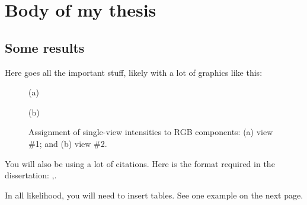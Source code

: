 \chapter{Body of my thesis}
\label{chapter:body}
\thispagestyle{myheadings}

\graphicspath{{2_Body/Figures/}}

\section{Some results}
\label{sec:results}

Here goes all the important stuff, likely with a lot of graphics like this:

\begin{figure}[htb]
  \begin{minipage}[t]{0.49\linewidth}\centering
    \medskip
    \centerline{(a)}
  \end{minipage}\hfill
  \begin{minipage}[t]{0.49\linewidth}\centering
    \medskip
    \centerline{(b)}
  \end{minipage}
  \caption{Assignment of single-view intensities to RGB components: (a) view
    \#1; and (b) view \#2. }
  \label{fig:Sampling}
\end{figure}

You will also be using a lot of citations. Here is the format required in the dissertation: \cite{lamport1985:latex},\cite{Debr01}.

In all likelihood, you will need to insert tables. See one example on the next page.
\clearpage

